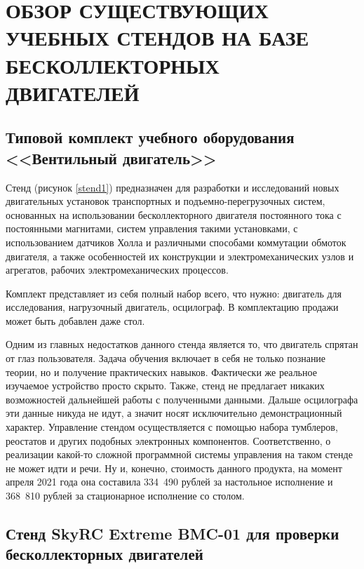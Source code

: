 \section{ОБЗОР СУЩЕСТВУЮЩИХ УЧЕБНЫХ СТЕНДОВ НА БАЗЕ БЕСКОЛЛЕКТОРНЫХ ДВИГАТЕЛЕЙ}

\subsection{Типовой комплект учебного оборудования <<Вентильный двигатель>>}


Стенд (рисунок \ref{stend1}) предназначен для разработки и исследований новых двигательных 
установок транспортных и подъемно-перегрузочных систем, основанных на 
использовании бесколлекторного двигателя постоянного тока с постоянными 
магнитами, систем управления такими установками, с использованием 
датчиков Холла и различными способами коммутации обмоток двигателя, а 
также особенностей их конструкции и электромеханических узлов и агрегатов, 
рабочих электромеханических процессов. 

Комплект представляет из себя полный набор всего, что нужно:
двигатель для исследования, нагрузочный двигатель, осцилограф. В комплектацию продажи
может быть добавлен даже стол. 

Одним из главных недостатков данного стенда является то, что двигатель спрятан от глаз пользователя.
Задача обучения включает в себя не только познание теории, но и получение практических навыков.
Фактически же реальное изучаемое устройство просто скрыто. Также, стенд не предлагает никаких
возможностей дальнейшей работы с полученными данными. Дальше осцилографа эти данные никуда не идут,
а значит носят исключительно демонстрационный характер.
Управление стендом осуществляется с помощью набора тумблеров, реостатов и других подобных
электронных компонентов. Соответственно, о реализации какой-то сложной программной 
системы управления на таком стенде не может идти и речи. Ну и, конечно, стоимость данного продукта,
на момент апреля 2021 года она составила 334~490 рублей за настольное исполнение и 368~810 рублей за
стационарное исполнение со столом.

\subsection{Стенд SkyRC Extreme BMC-01 для проверки бесколлекторных двигателей}


